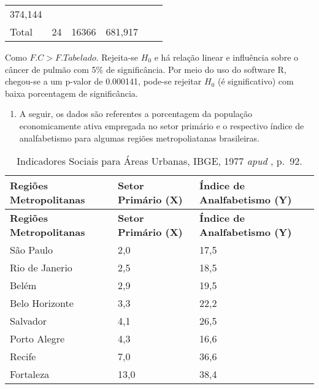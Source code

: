 \documentclass[
]{book}
\providecommand{\tightlist}{%
  \setlength{\itemsep}{0pt}\setlength{\parskip}{0pt}}
\begin{document}
\begin{longtable}[]{@{}llllll@{}}
\begin{minipage}[t]{0.14\columnwidth}
374,144\strut
\end{minipage} & \begin{minipage}[t]{0.14\columnwidth}\raggedright
\strut
\end{minipage} & \begin{minipage}[t]{0.14\columnwidth}\raggedright
\strut
\end{minipage}\tabularnewline
\begin{minipage}[t]{0.14\columnwidth}\raggedright
Total\strut
\end{minipage} & \begin{minipage}[t]{0.14\columnwidth}\raggedright
24\strut
\end{minipage} & \begin{minipage}[t]{0.14\columnwidth}\raggedright
16366\strut
\end{minipage} & \begin{minipage}[t]{0.14\columnwidth}\raggedright
681,917\strut
\end{minipage} & \begin{minipage}[t]{0.14\columnwidth}\raggedright
\strut
\end{minipage} & \begin{minipage}[t]{0.14\columnwidth}\raggedright
\strut
\end{minipage}\tabularnewline
\bottomrule
\end{longtable}

Como \(F.C > F. Tabelado\). Rejeita-se \(H_0\) e há relação linear e influência sobre o câncer de pulmão com 5\% de significância. Por meio do uso do software R, chegou-se a um p-valor de 0.000141, pode-se rejeitar \(H_0\) (é significativo) com baixa porcentagem de significância.

\begin{enumerate}
\def\labelenumi{\arabic{enumi}.}
\setcounter{enumi}{1}
\tightlist
\item
  A seguir, os dados são referentes a porcentagem da população economicamente ativa empregada no setor primário e o respectivo índice de analfabetismo para algumas regiões metropoliatanas brasileiras.
\end{enumerate}

\begin{longtable}[]{@{}lll@{}}
\caption{\label{tab:ecoativa} Indicadores Sociais para Áreas Urbanas, IBGE, 1977 \emph{apud} \citep{morettin2017estatistica}, p.~92.}\tabularnewline
\toprule
\textbf{Regiões Metropolitanas} & \textbf{Setor Primário (X)} & \textbf{Índice de Analfabetismo (Y)}\tabularnewline
\midrule
\endfirsthead
\toprule
\textbf{Regiões Metropolitanas} & \textbf{Setor Primário (X)} & \textbf{Índice de Analfabetismo (Y)}\tabularnewline
\midrule
\endhead
São Paulo & 2,0 & 17,5\tabularnewline
Rio de Janerio & 2,5 & 18,5\tabularnewline
Belém & 2,9 & 19,5\tabularnewline
Belo Horizonte & 3,3 & 22,2\tabularnewline
Salvador & 4,1 & 26,5\tabularnewline
Porto Alegre & 4,3 & 16,6\tabularnewline
Recife & 7,0 & 36,6\tabularnewline
Fortaleza & 13,0 & 38,4\tabularnewline
\bottomrule
\end{longtable}
\end{document}
